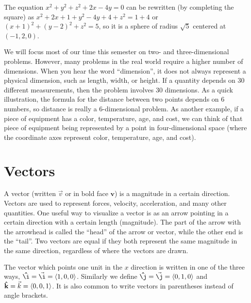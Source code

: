 \begin{example}
  The equation $x^2+y^2+z^2+2x-4y = 0$ can be rewritten (by completing
  the square) as $x^2+2x+1+y^2-4y+4+z^2=1+4$ or
  $(x+1)^2+(y-2)^2+z^2=5$, so it is a sphere of radius $\sqrt 5$
  centered at $(-1,2,0)$.
\end{example}

We will focus most of our time this semester on two- and
three-dimensional problems. However, many problems in the real world
require a higher number of dimensions. When you hear the word
``dimension'', it does not always represent a physical dimension, such
as length, width, or height.  If a quantity depends on 30 different
measurements, then the problem involves 30 dimensions.  As a quick
illustration, the formula for the distance between two points depends
on 6 numbers, so distance is really a 6-dimensional problem.  As
another example, if a piece of equipment has a color, temperature,
age, and cost, we can think of that piece of equipment being
represented by a point in four-dimensional space (where the coordinate
axes represent color, temperature, age, and cost).

\section{Vectors}
A vector (written $\vec v$ or in bold face $\mathbf{v}$) is a
magnitude in a certain direction. Vectors are used to represent
forces, velocity, acceleration, and many other quantities. One useful
way to visualize a vector is as an arrow pointing in a certain
direction with a certain length (magnitude).  
The part of the arrow
with the arrowhead is called the ``head'' of the arrow or vector,
while the other end is the ``tail''.  Two vectors are equal if they
both represent the same magnitude in the same direction, regardless of
where the vectors are drawn.
{}



The vector which points one unit in the $x$ direction is written in
one of the three ways, $\ii = \vec \i= \langle1,0,0\rangle$. Similarly we define
$\jj = \vec \j= \langle0,1,0\rangle$ and $\mathbf{\hat k} = \vec k = \langle0,0,1\rangle$. It is also
common to write vectors in parentheses instead of angle brackets.

